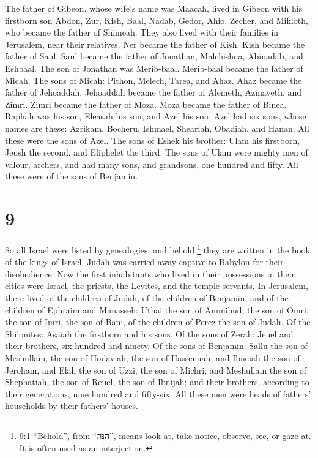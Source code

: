  The father of Gibeon, whose wife's name was Maacah, lived
in Gibeon  with his firstborn son Abdon, Zur, Kish, Baal,
Nadab,  Gedor, Ahio, Zecher,  and Mikloth, who
became the father of Shimeah. They also lived with their families in
Jerusalem, near their relatives.  Ner became the father of
Kish. Kish became the father of Saul. Saul became the father of
Jonathan, Malchishua, Abinadab, and Eshbaal.  The son of
Jonathan was Merib-baal. Merib-baal became the father of Micah.
 The sons of Micah: Pithon, Melech, Tarea, and Ahaz.
 Ahaz became the father of Jehoaddah. Jehoaddah became the
father of Alemeth, Azmaveth, and Zimri. Zimri became the father of Moza.
 Moza became the father of Binea. Raphah was his son,
Eleasah his son, and Azel his son.  Azel had six sons,
whose names are these: Azrikam, Bocheru, Ishmael, Sheariah, Obadiah, and
Hanan. All these were the sons of Azel.  The sons of Eshek
his brother: Ulam his firstborn, Jeush the second, and Eliphelet the
third.  The sons of Ulam were mighty men of valour,
archers, and had many sons, and grandsons, one hundred and fifty. All
these were of the sons of Benjamin.

\hypertarget{section-8}{%
\section{9}\label{section-8}}

 So all Israel were listed by genealogies; and
behold,\footnote{9:1 ``Behold'', from ``הִנֵּה'', means look at, take
  notice, observe, see, or gaze at. It is often used as an interjection.}
they are written in the book of the kings of Israel. Judah was carried
away captive to Babylon for their disobedience.  Now the
first inhabitants who lived in their possessions in their cities were
Israel, the priests, the Levites, and the temple servants. 
In Jerusalem, there lived of the children of Judah, of the children of
Benjamin, and of the children of Ephraim and Manasseh: 
Uthai the son of Ammihud, the son of Omri, the son of Imri, the son of
Bani, of the children of Perez the son of Judah.  Of the
Shilonites: Asaiah the firstborn and his sons.  Of the sons
of Zerah: Jeuel and their brothers, six hundred and ninety. 
Of the sons of Benjamin: Sallu the son of Meshullam, the son of
Hodaviah, the son of Hassenuah;  and Ibneiah the son of
Jeroham, and Elah the son of Uzzi, the son of Michri; and Meshullam the
son of Shephatiah, the son of Reuel, the son of Ibnijah; 
and their brothers, according to their generations, nine hundred and
fifty-six. All these men were heads of fathers' households by their
fathers' houses.

